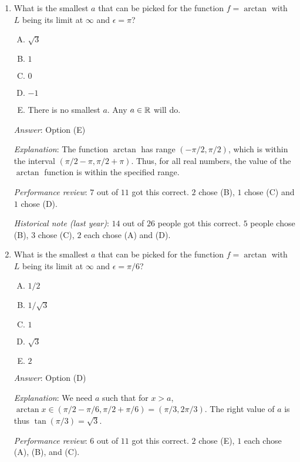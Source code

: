 \documentclass[10pt]{amsart}
\begin{document}
\begin{enumerate}
  {\em Performance review}: $10$ out of $11$ got this correct. $1$
  chose (D).

  {\em Historical note (last year)}: $17$ out of $26$ people got this
  correct. $6$ people chose (D), $2$ people chose (E), and $1$ person
  chose (C).
\item What is the smallest $a$ that can be picked for the function $f
  = \arctan$ with $L$ being its limit at $\infty$ and $\epsilon =
  \pi$?
  \begin{enumerate}[(A)]
  \item $\sqrt{3}$
  \item $1$
  \item $0$
  \item $-1$
  \item There is no smallest $a$. Any $a \in \mathbb{R}$ will do.
  \end{enumerate}

  {\em Answer}: Option (E)

  {\em Explanation}: The function $\arctan$ has range
  $(-\pi/2,\pi/2)$, which is within the interval $(\pi/2 - \pi, \pi/2
  + \pi)$. Thus, for all real numbers, the value of the $\arctan$
  function is within the specified range.

  {\em Performance review}: $7$ out of $11$ got this correct. $2$
  chose (B), $1$ chose (C) and $1$ chose (D).

  {\em Historical note (last year)}: $14$ out of $26$ people got this
  correct. $5$ people chose (B), $3$ chose (C), $2$ each chose (A) and
  (D).

\item What is the smallest $a$ that can be picked for the function $f
  = \arctan$ with $L$ being its limit at $\infty$ and $\epsilon =
  \pi/6$?
  \begin{enumerate}[(A)]
  \item $1/2$
  \item $1/\sqrt{3}$
  \item $1$
  \item $\sqrt{3}$
  \item $2$
  \end{enumerate}

  {\em Answer}: Option (D)

  {\em Explanation}: We need $a$ such that for $x > a$, $\arctan x \in
  (\pi/2 - \pi/6, \pi/2 + \pi/6) = (\pi/3,2\pi/3)$. The right value of
  $a$ is thus $\tan(\pi/3) = \sqrt{3}$.

  {\em Performance review}: $6$ out of $11$ got this correct. $2$
  chose (E), $1$ each chose (A), (B), and (C).


\end{enumerate}
\end{document}
